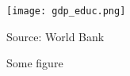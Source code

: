 \begin{figure}
\caption{Some figure\label{fig:gdp_educ}}

\begin{centering}
\medskip{}
\par\end{centering}
\begin{centering}
\texttt{[image: gdp\_educ.png]}\medskip{}
\par\end{centering}
{\footnotesize{}Source: World Bank}{\footnotesize\par}
\end{figure}

